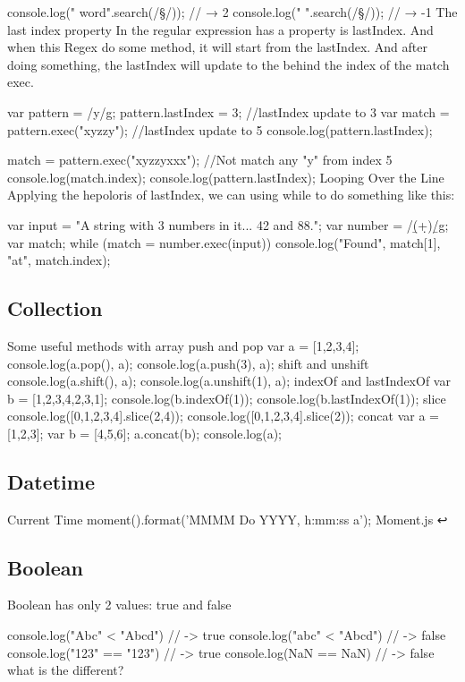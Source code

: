 console.log("  word".search(/\S/));
// → 2
console.log("    ".search(/\S/));
// → -1
The last index property
In the regular expression has a property is lastIndex. And when this Regex do some method, it will start from the lastIndex. And after doing something, the lastIndex will update to the behind the index of the match exec.

var pattern = /y/g;
pattern.lastIndex = 3; //lastIndex update to 3
var match = pattern.exec("xyzzy"); //lastIndex update to 5
console.log(pattern.lastIndex);

match = pattern.exec("xyzzyxxx"); //Not match any "y" from index 5
console.log(match.index);
console.log(pattern.lastIndex);
Looping Over the Line
Applying the hepoloris of lastIndex, we can using while to do something like this:

var input = "A string with 3 numbers in it... 42 and 88.";
var number = /\b(\d+)\b/g;
var match;
while (match = number.exec(input))
  console.log("Found", match[1], "at", match.index);

\subsection{Collection}

Some useful methods with array
push and pop
var a = [1,2,3,4];
console.log(a.pop(), a);
console.log(a.push(3), a);
shift and unshift
console.log(a.shift(), a);
console.log(a.unshift(1), a);
indexOf and lastIndexOf
var b = [1,2,3,4,2,3,1];
console.log(b.indexOf(1));
console.log(b.lastIndexOf(1));
slice
console.log([0,1,2,3,4].slice(2,4));
console.log([0,1,2,3,4].slice(2));
concat
var a = [1,2,3];
var b = [4,5,6];
a.concat(b);
console.log(a);

\subsection{Datetime}

Current Time
moment().format('MMMM Do YYYY, h:mm:ss a');
Moment.js ↩

\subsection{Boolean}

Boolean has only 2 values: true and false

console.log("Abc" < "Abcd") // -> true
console.log("abc" < "Abcd") // -> false
console.log("123" == "123") // -> true
console.log(NaN == NaN) // -> false
what is the different?


